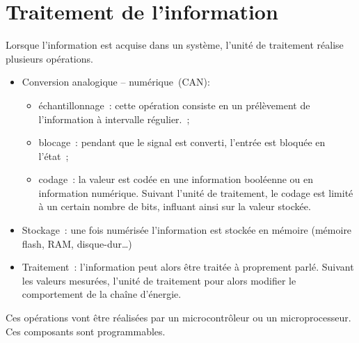 \documentclass[
]{article}
\begin{document}
\hypertarget{traitement-de-linformation}{%
\section{Traitement de l'information}\label{traitement-de-linformation}}

Lorsque l'information est acquise dans un système, l'unité de traitement
réalise plusieurs opérations.

\begin{itemize}
\item
  Conversion analogique -- numérique~(CAN):

  \begin{itemize}
  \item
    échantillonnage~: cette opération consiste en un prélèvement de
    l'information à intervalle régulier.~;
  \item
    blocage~: pendant que le signal est converti, l'entrée est bloquée
    en l'état~;
  \item
    codage~: la valeur est codée en une information booléenne ou en
    information numérique. Suivant l'unité de traitement, le codage est
    limité à un certain nombre de bits, influant ainsi sur la valeur
    stockée.
  \end{itemize}
\item
  Stockage~: une fois numérisée l'information est stockée en mémoire
  (mémoire flash, RAM, disque-dur\ldots)
\item
  Traitement~: l'information peut alors être traitée à proprement parlé.
  Suivant les valeurs mesurées, l'unité de traitement pour alors
  modifier le comportement de la chaîne d'énergie.
\end{itemize}

Ces opérations vont être réalisées par un microcontrôleur ou un
microprocesseur. Ces composants sont programmables.
\end{document}
